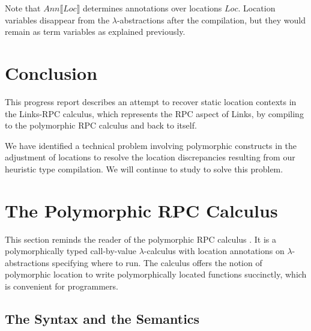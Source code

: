 \documentclass[a4paper]{article}
\theoremstyle{plain}
\theoremstyle{definition}
\newcommand{\anncomp}[1]{Ann\llbracket#1\rrbracket}
\newcommand{\Loc}{Loc}
\begin{document}
%
Note that $\anncomp{\Loc}$ determines annotations over locations
$\Loc$.
%
Location variables disappear from the $\lambda$-abstractions after the
compilation, but they would remain as term variables as explained
previously.

\section{Conclusion}
\label{sec:conclusion}

%
This progress report describes an attempt to recover static location
contexts in the Links-RPC calculus, which represents the RPC aspect of
Links, by compiling to the polymorphic RPC calculus and back to
itself.

%
We have identified a technical problem involving polymorphic
constructs in the adjustment of locations to resolve the location
discrepancies resulting from our heuristic type compilation.
%
We will continue to study to solve this problem.




\appendix

\section{The Polymorphic RPC Calculus}
\label{app:1}

This section reminds the reader of the polymorphic RPC calculus
\cite{CHOI:scp2020}.
%
It is a polymorphically typed call-by-value $\lambda$-calculus with
location annotations on $\lambda$-abstractions specifying where to
run.
%
The calculus offers the notion of polymorphic location to write
polymorphically located functions succinctly, which is convenient for
programmers.

\subsection{The Syntax and the Semantics}
\label{sec:polyrpc:syntax&semantics}
\end{document}
